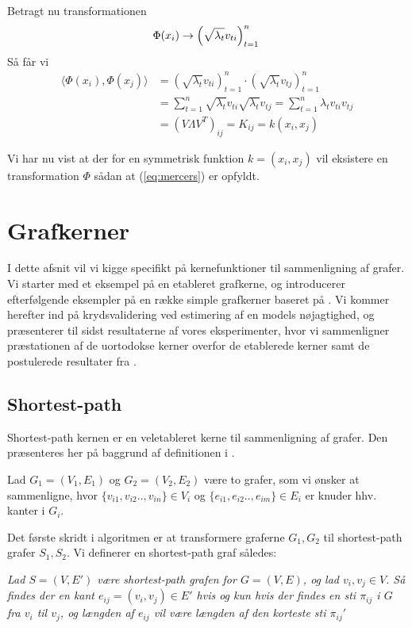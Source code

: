 \documentclass{article}
\begin{document}
Betragt nu transformationen 
\begin{equation}
\Phi(x_i)\rightarrow\left(\sqrt{\lambda_t}v_{ti}\right)_{t=1}^n\\
\end{equation}
Så får vi
\begin{align}
\langle\Phi(x_i),\Phi(x_j)\rangle&=\left(\sqrt{\lambda_t}v_{ti}\right)_{t=1}^n\cdot\left(\sqrt{\lambda_t}v_{tj}\right)_{t=1}^n\\
&=\sum_{t=1}^n\sqrt{\lambda_t}v_{ti}\sqrt{\lambda_t}v_{tj}=\sum_{t=1}^{n}\lambda_tv_{ti}v_{tj}\\
&= \left(V\Lambda V^T\right)_{ij} = K_{ij}=k(x_i,x_j)
\end{align}



Vi har nu vist at der for en symmetrisk funktion $k=(x_i,x_j)$ vil eksistere en transformation $\Phi$ sådan at (\ref{eq:mercers}) er opfyldt.



\section{Grafkerner}
I dette afsnit vil vi kigge specifikt på kernefunktioner til sammenligning af grafer. Vi starter med et eksempel på en etableret grafkerne, og introducerer efterfølgende eksempler på en række simple grafkerner baseret på \cite{trivial-kernels}. Vi kommer herefter ind på krydsvalidering ved estimering af en models nøjagtighed, og præsenterer til sidst resultaterne af vores eksperimenter, hvor vi sammenligner præstationen af de uortodokse kerner overfor de etablerede kerner samt de postulerede resultater fra \cite{trivial-kernels}.

\subsection{Shortest-path}
Shortest-path kernen er en veletableret kerne til sammenligning af grafer. Den præsenteres her på baggrund af definitionen i \cite{shortest-path}. 

Lad $G_1=(V_1,E_1)$ og $G_2=(V_2,E_2)$ være to grafer, som vi ønsker at sammenligne, hvor $\{v_{i1},v_{i2}..,v_{in}\}\in V_i$ og $\{e_{i1},e_{i2}..,e_{im}\}\in E_i$ er knuder hhv. kanter i $G_i$.

Det første skridt i algoritmen er at transformere graferne $G_1,G_2$ til shortest-path grafer $S_1,S_2$. Vi definerer en shortest-path graf således:

\textit{Lad $S=(V,E')$ være shortest-path grafen for $G=(V,E)$, og lad $v_i,v_j\in V$. Så findes der en kant $e_{ij}=(v_i,v_j)\in E'$ hvis og kun hvis der findes en sti $\pi_{ij}$ i $G$ fra $v_i$ til $v_j$, og længden af $e_{ij}$ vil være længden af den korteste sti $\pi_{ij}'$}
\end{document}
